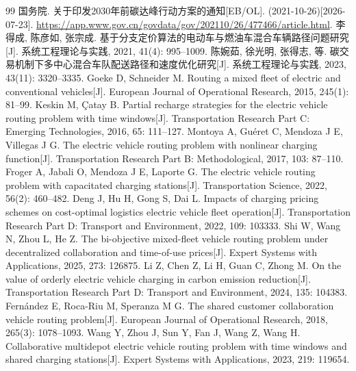 \documentclass{setp-new}
\begin{document}
\maketitle
\clearpage


\begin{thebibliography}{99}
 国务院. 关于印发2030年前碳达峰行动方案的通知[EB/OL]. (2021-10-26)[2026-07-23]. \url{https://app.www.gov.cn/govdata/gov/202110/26/477466/article.html}.
 李得成, 陈彦如, 张宗成. 基于分支定价算法的电动车与燃油车混合车辆路径问题研究[J]. 系统工程理论与实践, 2021, 41(4): 995--1009.
 陈婉茹, 徐光明, 张得志, 等. 碳交易机制下多中心混合车队配送路径和速度优化研究[J]. 系统工程理论与实践, 2023, 43(11): 3320--3335.
 Goeke D, Schneider M. Routing a mixed fleet of electric and conventional vehicles[J]. European Journal of Operational Research, 2015, 245(1): 81--99.
 Keskin M, \c{C}atay B. Partial recharge strategies for the electric vehicle routing problem with time windows[J]. Transportation Research Part C: Emerging Technologies, 2016, 65: 111--127.
 Montoya A, Guéret C, Mendoza J E, Villegas J G. The electric vehicle routing problem with nonlinear charging function[J]. Transportation Research Part B: Methodological, 2017, 103: 87--110.
 Froger A, Jabali O, Mendoza J E, Laporte G. The electric vehicle routing problem with capacitated charging stations[J]. Transportation Science, 2022, 56(2): 460--482.
 Deng J, Hu H, Gong S, Dai L. Impacts of charging pricing schemes on cost-optimal logistics electric vehicle fleet operation[J]. Transportation Research Part D: Transport and Environment, 2022, 109: 103333.
 Shi W, Wang N, Zhou L, He Z. The bi-objective mixed-fleet vehicle routing problem under decentralized collaboration and time-of-use prices[J]. Expert Systems with Applications, 2025, 273: 126875.
 Li Z, Chen Z, Li H, Guan C, Zhong M. On the value of orderly electric vehicle charging in carbon emission reduction[J]. Transportation Research Part D: Transport and Environment, 2024, 135: 104383.
 Fern\'{a}ndez E, Roca-Riu M, Speranza M G. The shared customer collaboration vehicle routing problem[J]. European Journal of Operational Research, 2018, 265(3): 1078--1093.
 Wang Y, Zhou J, Sun Y, Fan J, Wang Z, Wang H. Collaborative multidepot electric vehicle routing problem with time windows and shared charging stations[J]. Expert Systems with Applications, 2023, 219: 119654.

\end{thebibliography}
\end{document}
